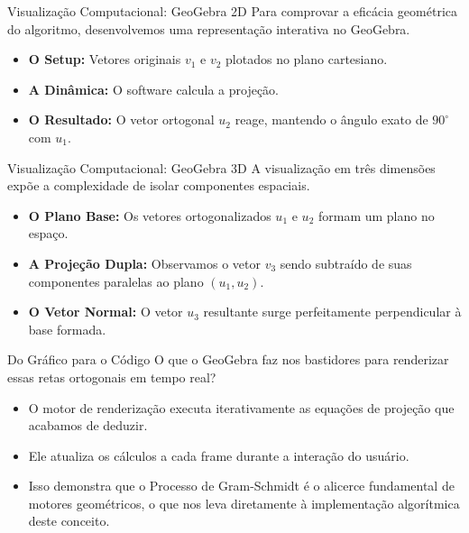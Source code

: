 \documentclass{beamer}
\begin{document}
\begin{frame}{Visualização Computacional: GeoGebra 2D}
Para comprovar a eficácia geométrica do algoritmo, desenvolvemos uma representação interativa no GeoGebra.

\vspace{0.3cm}
\begin{itemize}
    \item \textbf{O Setup:} Vetores originais $v_1$ e $v_2$ plotados no plano cartesiano.
    \item \textbf{A Dinâmica:} O software calcula a projeção.
    \item \textbf{O Resultado:} O vetor ortogonal $u_2$ reage, mantendo o ângulo exato de $90^\circ$ com $u_1$.
\end{itemize}

\vspace{0.5cm}
\end{frame}

\begin{frame}{Visualização Computacional: GeoGebra 3D}
A visualização em três dimensões expõe a complexidade de isolar componentes espaciais.

\vspace{0.3cm}
\begin{itemize}
    \item \textbf{O Plano Base:} Os vetores ortogonalizados $u_1$ e $u_2$ formam um plano no espaço.
    \item \textbf{A Projeção Dupla:} Observamos o vetor $v_3$ sendo subtraído de suas componentes paralelas ao plano $(u_1, u_2)$.
    \item \textbf{O Vetor Normal:} O vetor $u_3$ resultante surge perfeitamente perpendicular à base formada.
\end{itemize}

\vspace{0.5cm}
\end{frame}

\begin{frame}{Do Gráfico para o Código}
O que o GeoGebra faz nos bastidores para renderizar essas retas ortogonais em tempo real?

\vspace{0.3cm}
\begin{itemize}
    \item O motor de renderização executa iterativamente as equações de projeção que acabamos de deduzir.
    \item Ele atualiza os cálculos a cada frame durante a interação do usuário.
    \item Isso demonstra que o Processo de Gram-Schmidt é o alicerce fundamental de motores geométricos, o que nos leva diretamente à implementação algorítmica deste conceito.
\end{itemize}
\end{frame}
\end{document}
